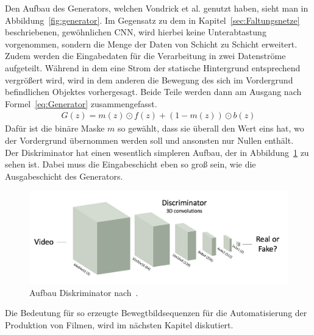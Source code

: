 \documentclass[times, 12pt,twocolumn]{article}
\begin{document}
Den Aufbau des Generators, welchen Vondrick et al. genutzt haben, sieht man in Abbildung~\ref{fig:generator}. Im Gegensatz zu dem in Kapitel~\ref{sec:Faltungsnetze} beschriebenen, gewöhnlichen CNN, wird hierbei keine Unterabtastung vorgenommen, sondern die Menge der Daten von Schicht zu Schicht erweitert. Zudem werden die Eingabedaten für die Verarbeitung in zwei Datenströme aufgeteilt. Während in dem eine Strom der statische Hintergrund entsprechend vergrößert wird, wird in dem anderen die Bewegung des sich im Vordergrund befindlichen Objektes vorhergesagt. Beide Teile werden dann am Ausgang nach Formel~\ref{eq:Generator} zusammengefasst.
\footnotesize
\begin{equation}
\begin{aligned}
G(z) = m(z) \odot f(z) + (1-m(z))\odot b(z)
\end{aligned}
	\label{eq:Generator}
\end{equation}
\small
Dafür ist die binäre Maske $m$ so gewählt, dass sie überall den Wert eins hat, wo der Vordergrund übernommen werden soll und ansonsten nur Nullen enthält. \\
Der Diskriminator hat einen wesentlich simpleren Aufbau, der in Abbildung~\ref{fig:discriminator} zu sehen ist. Dabei muss die Eingabeschicht eben so groß sein, wie die Ausgabeschicht des Generators.\\
\begin{figure}
	\flushleft
	\includegraphics[width=\columnwidth]{Bilder/discriminator.jpg}
	\caption{Aufbau Diskriminator nach~\cite{VondrickPT16}.}
	\label{fig:discriminator}
\end{figure}
Die Bedeutung für so erzeugte Bewegtbildsequenzen für die Automatisierung der Produktion von Filmen, wird im nächsten Kapitel diskutiert.
\end{document}
